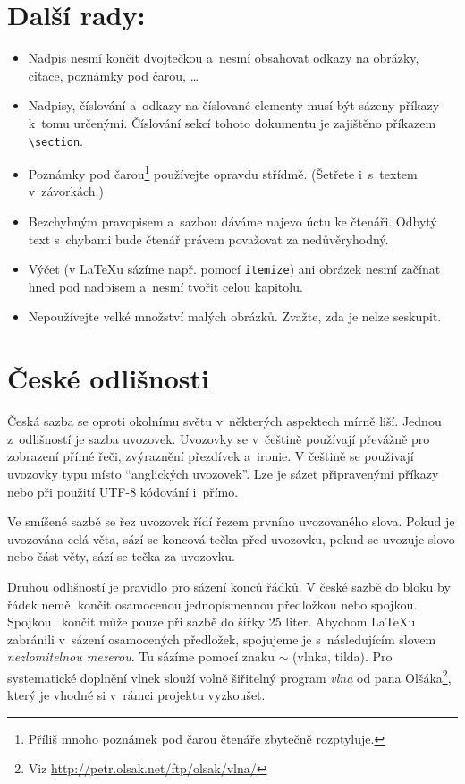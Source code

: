 \documentclass[twocolumn]{article}
\begin{document}
\section{Další rady:}
\begin{itemize}
    \item Nadpis nesmí končit dvojtečkou a~nesmí obsahovat odkazy na obrázky, citace, poznámky pod čarou, \dots
    \item Nadpisy, číslování a~odkazy na číslované elementy musí být sázeny příkazy k~tomu určenými.
    Číslování sekcí tohoto dokumentu je zajištěno příkazem \verb|\section|.
    \item Poznámky pod čarou\footnote{Příliš mnoho poznámek pod čarou čtenáře zbytečně rozptyluje.} používejte opravdu střídmě.
    (Šetřete i~s~textem v~závorkách.)
    \item Bezchybným pravopisem a~sazbou dáváme najevo úctu ke čtenáři.
    Odbytý text s~chybami bude čtenář právem považovat za nedůvěryhodný.
    \item Výčet (v \LaTeX u sázíme např. pomocí \texttt{itemize}) ani obrázek nesmí začínat hned pod nadpisem a~nesmí tvořit celou kapitolu.
    \item Nepoužívejte velké množství malých obrázků.
    Zvažte, zda je nelze seskupit.
\end{itemize}
\section{České odlišnosti}
Česká sazba se oproti okolnímu světu v~některých aspektech mírně liší.
Jednou z~odlišností je sazba uvozovek.
Uvozovky se v~češtině používají převážně pro zobrazení přímé řeči, zvýraznění přezdívek a~ironie.
V češtině se používají uvozovky typu  místo ``anglických uvozovek''.
Lze je sázet připravenými příkazy nebo při použití UTF-8 kódování i~přímo.

Ve smíšené sazbě se řez uvozovek řídí řezem prvního uvozovaného slova.
Pokud je uvozována celá věta, sází se koncová tečka před uvozovku, pokud se uvozuje slovo nebo část věty, sází se tečka za uvozovku.

Druhou odlišností je pravidlo pro sázení konců řádků.
V české sazbě do bloku by řádek neměl končit osamocenou jednopísmennou předložkou nebo spojkou.
Spojkou ~končit může pouze při sazbě do šířky 25 liter.
Abychom \LaTeX u zabránili v~sázení osamocených předložek, spojujeme je s~následujícím slovem \emph{nezlomitelnou mezerou}.
Tu sázíme pomocí znaku \(\sim \) (vlnka, tilda).
Pro systematické doplnění vlnek slouží volně šiřitelný program \emph{vlna} od pana Olšáka\footnote{Viz \href{mailto:http://petr.olsak.net/ftp/olsak/vlna/}{http://petr.olsak.net/ftp/olsak/vlna/}}, který je vhodné si v~rámci projektu vyzkoušet.
\end{document}
